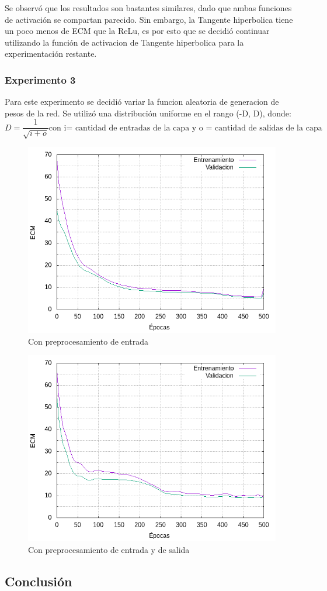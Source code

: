 Se observó que los resultados son bastantes similares, dado que ambas funciones de activación se compartan parecido. Sin embargo, la Tangente hiperbolica tiene un poco menos
de ECM que la ReLu, es por esto que se decidió continuar utilizando la función de activacion de Tangente hiperbolica para la experimentación restante.

\subsubsection{Experimento 3}
Para este experimento se decidió variar la funcion aleatoria de generacion de pesos de la red. Se utilizó una distribución uniforme en el rango (-D, D), donde:
\begin{equation}
  D = \frac{1}{\sqrt{i + o}} \mbox{con i= cantidad de entradas de la capa y o = cantidad de salidas de la capa}
\end{equation}

\begin{figure}[h!]
  \includegraphics[width=125mm]{imagenes/ej2/ex_3-1_red-9-17-2_errors.png}
  \caption{Con preprocesamiento de entrada}
\end{figure}

\begin{figure}[h!]
  \includegraphics[width=125mm]{imagenes/ej2/ex_3-2_red-9-17-2_errors.png}
  \caption{Con preprocesamiento de entrada y de salida}
\end{figure}
\subsection{Conclusión}

\newpage
